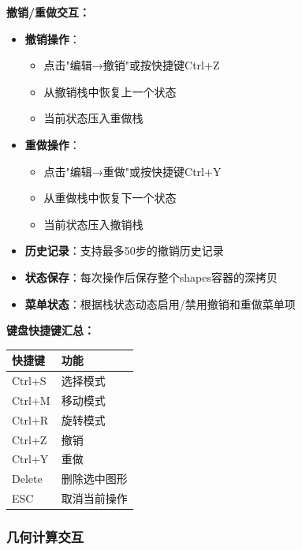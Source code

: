 \documentclass[12pt,a4paper]{article}
\begin{document}
\begin{tcolorbox}
\textbf{撤销/重做交互：}
\begin{itemize}
    \item \textbf{撤销操作}：
    \begin{itemize}
        \item 点击"编辑→撤销"或按快捷键Ctrl+Z
        \item 从撤销栈中恢复上一个状态
        \item 当前状态压入重做栈
    \end{itemize}
    \item \textbf{重做操作}：
    \begin{itemize}
        \item 点击"编辑→重做"或按快捷键Ctrl+Y
        \item 从重做栈中恢复下一个状态
        \item 当前状态压入撤销栈
    \end{itemize}
    \item \textbf{历史记录}：支持最多50步的撤销历史记录
    \item \textbf{状态保存}：每次操作后保存整个shapes容器的深拷贝
    \item \textbf{菜单状态}：根据栈状态动态启用/禁用撤销和重做菜单项
\end{itemize}

\textbf{键盘快捷键汇总：}
\begin{table}[H]
\centering
\begin{tabular}{|l|l|}
\hline
\textbf{快捷键} & \textbf{功能} \\
\hline
Ctrl+S & 选择模式 \\
\hline
Ctrl+M & 移动模式 \\
\hline
Ctrl+R & 旋转模式 \\
\hline
Ctrl+Z & 撤销 \\
\hline
Ctrl+Y & 重做 \\
\hline
Delete & 删除选中图形 \\
\hline
ESC & 取消当前操作 \\
\hline
\end{tabular}
\end{table}
\end{tcolorbox}

\subsubsection{几何计算交互}
\end{document}
